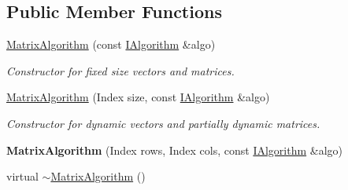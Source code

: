 \subsection*{Public Member Functions}
\begin{DoxyCompactItemize}
\item 
\hyperlink{classow__core_1_1MatrixAlgorithm_a7dd709fa5f8168bfe71c24a380fde4e7}{Matrix\+Algorithm} (const \hyperlink{classow__core_1_1IScalarAlgorithm}{I\+Algorithm} \&algo)
\begin{DoxyCompactList}\small\item\em Constructor for fixed size vectors and matrices. \end{DoxyCompactList}\item 
\hyperlink{classow__core_1_1MatrixAlgorithm_a511f58e2e6b40f85686784c3b50c42a8}{Matrix\+Algorithm} (Index size, const \hyperlink{classow__core_1_1IScalarAlgorithm}{I\+Algorithm} \&algo)
\begin{DoxyCompactList}\small\item\em Constructor for dynamic vectors and partially dynamic matrices. \end{DoxyCompactList}\item 
{\bfseries Matrix\+Algorithm} (Index rows, Index cols, const \hyperlink{classow__core_1_1IScalarAlgorithm}{I\+Algorithm} \&algo)\hypertarget{classow__core_1_1MatrixAlgorithm_ab60ff922e6be17d8a7c4e35e2cf53b57}{}\label{classow__core_1_1MatrixAlgorithm_ab60ff922e6be17d8a7c4e35e2cf53b57}

\item 
virtual \hyperlink{classow__core_1_1MatrixAlgorithm_a0384c74074b13a1ce6fa4119c6cab142}{$\sim$\+Matrix\+Algorithm} ()\hypertarget{classow__core_1_1MatrixAlgorithm_a0384c74074b13a1ce6fa4119c6cab142}{}\label{classow__core_1_1MatrixAlgorithm_a0384c74074b13a1ce6fa4119c6cab142}


\end{DoxyCompactItemize}
